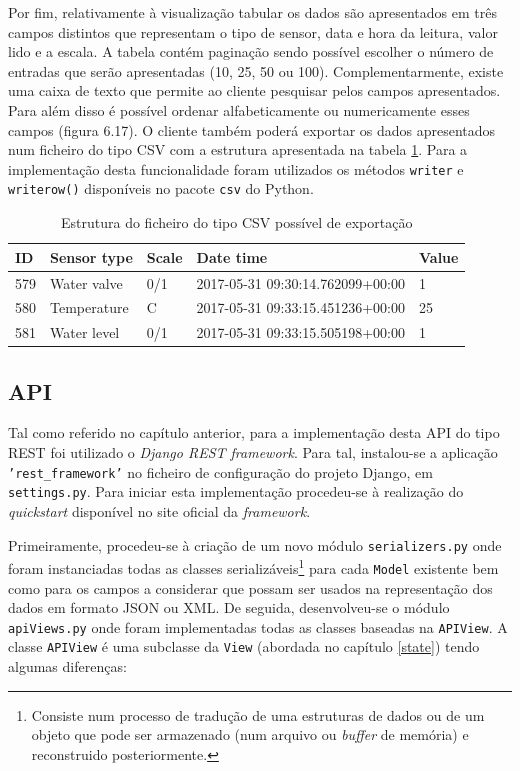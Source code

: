 Por fim, relativamente à visualização tabular os dados são apresentados em três campos distintos que representam o tipo de sensor, data e hora da leitura, valor lido e a escala. A tabela contém paginação sendo possível escolher o número de entradas que serão apresentadas (10, 25, 50 ou 100). Complementarmente, existe uma caixa de texto que permite ao cliente pesquisar pelos campos apresentados. Para além disso é possível ordenar alfabeticamente ou numericamente esses campos (figura 6.17). O cliente também poderá exportar os dados apresentados num ficheiro do tipo \ac{CSV} com a estrutura apresentada na tabela \ref{exportcsv}. Para a implementação desta funcionalidade foram utilizados os métodos \texttt{writer} e \texttt{writerow()} disponíveis no pacote \texttt{csv} do Python.  


\begin{table}[h]
	\centering

	\begin{tabular}{|l|l|l|l|l|}
		\hline
		ID & Sensor type & Scale & Date time & Value \\ \hline
		579 & Water valve & 0/1 & 2017-05-31 09:30:14.762099+00:00 & 1 \\ \hline
		580 & Temperature & C & 2017-05-31 09:33:15.451236+00:00 & 25 \\ \hline
		581 & Water level & 0/1 & 2017-05-31 09:33:15.505198+00:00 & 1 \\ \hline
	\end{tabular}
	\caption{Estrutura do ficheiro do tipo \acs{CSV} possível de exportação}
	\label{exportcsv}
\end{table}


\subsection{API}


Tal como referido no capítulo anterior, para a implementação desta API do tipo REST foi utilizado o \textit{Django REST framework}. Para tal, instalou-se a aplicação \texttt{'rest\_framework'} no ficheiro de configuração do projeto Django, em \texttt{settings.py}. Para iniciar esta implementação procedeu-se à realização do \textit{quickstart} disponível no site oficial da \textit{framework}\cite{quickstart}. 

Primeiramente, procedeu-se à criação de um novo módulo \texttt{serializers.py} onde foram instanciadas todas as classes serializáveis\footnote{Consiste num processo de tradução de uma estruturas de dados ou de um objeto que pode ser armazenado (num arquivo ou \textit{buffer} de memória) e reconstruido posteriormente.  } para cada \texttt{Model} existente bem como  para os campos a considerar que possam ser usados na representação dos dados em formato \ac{JSON} ou \ac{XML}. De seguida, desenvolveu-se o módulo \texttt{apiViews.py} onde foram implementadas todas as classes baseadas na \texttt{APIView}. A classe \texttt{APIView} é uma subclasse da \texttt{View} (abordada no capítulo \ref{state}) tendo algumas diferenças: 

